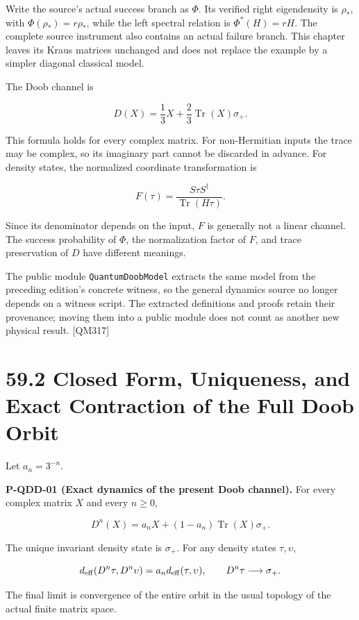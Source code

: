 \documentclass[
  11pt,
  oneside]{book}
\begin{document}
Write the source's actual success branch as \(\Phi\). Its verified right
eigendensity is \(\rho_*\), with \(\Phi(\rho_*)=r\rho_*\), while the
left spectral relation is \(\Phi^*(H)=rH\). The complete source
instrument also contains an actual failure branch. This chapter leaves
its Kraus matrices unchanged and does not replace the example by a
simpler diagonal classical model.

The Doob channel is

\[
D(X)=\frac13X+\frac23\operatorname{Tr}(X)\sigma_+.
\]

This formula holds for every complex matrix. For non-Hermitian inputs
the trace may be complex, so its imaginary part cannot be discarded in
advance. For density states, the normalized coordinate transformation is

\[
F(\tau)=\frac{S\tau S^\dagger}{\operatorname{Tr}(H\tau)}.
\]

Since its denominator depends on the input, \(F\) is generally not a
linear channel. The success probability of \(\Phi\), the normalization
factor of \(F\), and trace preservation of \(D\) have different
meanings.

The public module \texttt{Quantum\allowbreak Doob\allowbreak Model} extracts the same model from
the preceding edition's concrete witness, so the general dynamics source
no longer depends on a witness script. The extracted definitions and
proofs retain their provenance; moving them into a public module does
not count as another new physical result. {[}QM317{]}

\section{59.2 Closed Form, Uniqueness, and Exact Contraction of the Full
Doob Orbit}

Let \(a_n=3^{-n}\).

\label{p-qdd-01}{}

\textbf{P-QDD-01 (Exact dynamics of the present Doob channel).} For
every complex matrix \(X\) and every \(n\ge0\),

\[
D^n(X)=a_nX+(1-a_n)\operatorname{Tr}(X)\sigma_+.
\]

The unique invariant density state is \(\sigma_+\). For any density
states \(\tau,\upsilon\),

\[
d_{\rm eff}(D^n\tau,D^n\upsilon)
=a_n d_{\rm eff}(\tau,\upsilon),
\qquad D^n\tau\longrightarrow\sigma_+.
\]

The final limit is convergence of the entire orbit in the usual topology
of the actual finite matrix space.
\end{document}
